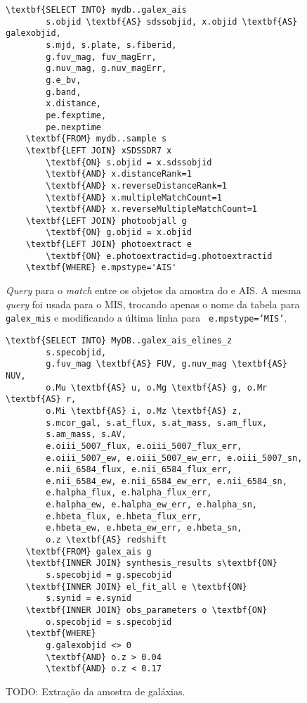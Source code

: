 \begin{figure}
	\begin{Verbatim}[commandchars=\\\{\}]
	\textbf{SELECT INTO} mydb..galex_ais
		s.objid \textbf{AS} sdssobjid, x.objid \textbf{AS} galexobjid,
		s.mjd, s.plate, s.fiberid,
		g.fuv_mag, fuv_magErr,
		g.nuv_mag, g.nuv_magErr,
		g.e_bv,
		g.band,
		x.distance,
		pe.fexptime,
		pe.nexptime
	\textbf{FROM} mydb..sample s
	\textbf{LEFT JOIN} xSDSSDR7 x
		\textbf{ON} s.objid = x.sdssobjid
		\textbf{AND} x.distanceRank=1
		\textbf{AND} x.reverseDistanceRank=1
		\textbf{AND} x.multipleMatchCount=1
		\textbf{AND} x.reverseMultipleMatchCount=1
	\textbf{LEFT JOIN} photoobjall g
		\textbf{ON} g.objid = x.objid
	\textbf{LEFT JOIN} photoextract e
		\textbf{ON} e.photoextractid=g.photoextractid
	\textbf{WHERE} e.mpstype='AIS'
	\end{Verbatim}
	\caption[{\em Match} entre os objetos da amostra do \starlight e \galex.]
	{{\em Query} para o {\em match} entre os objetos da amostra do \starlight e
	\galex AIS. A mesma {\em query} foi usada para o MIS, trocando apenas o nome da
	tabela para {\tt galex\_mis} e modificando a última linha para {\tt
	e.mpstype='MIS'}.}
	\label{fig:QueryMatchAIS}
\end{figure}

\begin{figure}
	\begin{Verbatim}[commandchars=\\\{\}]
	\textbf{SELECT INTO} MyDB..galex_ais_elines_z
		s.specobjid,
		g.fuv_mag \textbf{AS} FUV, g.nuv_mag \textbf{AS} NUV,
		o.Mu \textbf{AS} u, o.Mg \textbf{AS} g, o.Mr \textbf{AS} r,
		o.Mi \textbf{AS} i, o.Mz \textbf{AS} z,
		s.mcor_gal, s.at_flux, s.at_mass, s.am_flux,
		s.am_mass, s.AV,
		e.oiii_5007_flux, e.oiii_5007_flux_err,
		e.oiii_5007_ew, e.oiii_5007_ew_err, e.oiii_5007_sn,
		e.nii_6584_flux, e.nii_6584_flux_err,
		e.nii_6584_ew, e.nii_6584_ew_err, e.nii_6584_sn,
		e.halpha_flux, e.halpha_flux_err,
		e.halpha_ew, e.halpha_ew_err, e.halpha_sn,
		e.hbeta_flux, e.hbeta_flux_err,
		e.hbeta_ew, e.hbeta_ew_err, e.hbeta_sn,
		o.z \textbf{AS} redshift
	\textbf{FROM} galex_ais g
	\textbf{INNER JOIN} synthesis_results s\textbf{ON}
		s.specobjid = g.specobjid
	\textbf{INNER JOIN} el_fit_all e \textbf{ON}
		s.synid = e.synid
	\textbf{INNER JOIN} obs_parameters o \textbf{ON}
		o.specobjid = s.specobjid
	\textbf{WHERE}
		g.galexobjid <> 0
		\textbf{AND} o.z > 0.04
		\textbf{AND} o.z < 0.17
	\end{Verbatim}
	\caption[Extração da amostra de galáxias.]
	{TODO: Extração da amostra de galáxias.}
	\label{fig:QuerySampleAIS}
\end{figure}


